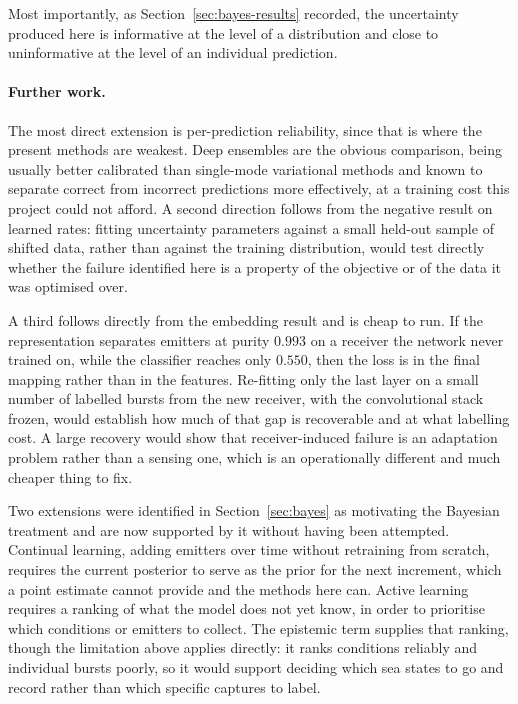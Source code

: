\documentclass{article}
\begin{document}
Most importantly, as Section~\ref{sec:bayes-results} recorded, the uncertainty
produced here is informative at the level of a distribution and close to
uninformative at the level of an individual prediction.

\paragraph{Further work.}
The most direct extension is per-prediction reliability, since that is where the
present methods are weakest. Deep ensembles are the obvious comparison, being
usually better calibrated than single-mode variational methods and known to
separate correct from incorrect predictions more effectively, at a training cost
this project could not afford. A second direction follows from the negative
result on learned rates: fitting uncertainty parameters against a small
held-out sample of shifted data, rather than against the training distribution,
would test directly whether the failure identified here is a property of the
objective or of the data it was optimised over.

A third follows directly from the embedding result and is cheap to run. If the
representation separates emitters at purity $0.993$ on a receiver the network
never trained on, while the classifier reaches only $0.550$, then the loss is in
the final mapping rather than in the features. Re-fitting only the last layer on
a small number of labelled bursts from the new receiver, with the convolutional
stack frozen, would establish how much of that gap is recoverable and at what
labelling cost. A large recovery would show that receiver-induced failure is an
adaptation problem rather than a sensing one, which is an operationally
different and much cheaper thing to fix.

Two extensions were identified in Section~\ref{sec:bayes} as motivating the
Bayesian treatment and are now supported by it without having been attempted.
Continual learning, adding emitters over time without retraining from scratch,
requires the current posterior to serve as the prior for the next increment,
which a point estimate cannot provide and the methods here can. Active learning
requires a ranking of what the model does not yet know, in order to prioritise
which conditions or emitters to collect. The epistemic term supplies that
ranking, though the limitation above applies directly: it ranks conditions
reliably and individual bursts poorly, so it would support deciding which sea
states to go and record rather than which specific captures to label.
\end{document}
